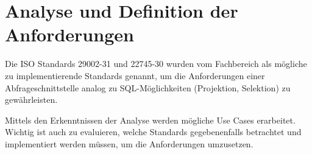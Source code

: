 \chapter{Analyse und Definition der Anforderungen } \label{kap:analyse_und_definition}

Die ISO Standards 29002-31 und 22745-30 wurden vom Fachbereich als mögliche zu implementierende Standards genannt, um die Anforderungen einer Abfrageschnittstelle analog zu SQL-Möglichkeiten (Projektion, Selektion) zu gewährleisten.   

Mittels den Erkenntnissen der Analyse werden mögliche Use Cases erarbeitet. Wichtig ist auch zu evaluieren, welche Standards gegebenenfalls betrachtet und implementiert werden müssen, um die Anforderungen umzusetzen. 



